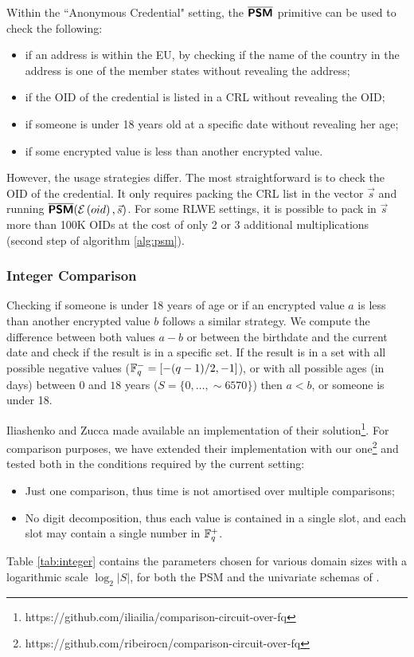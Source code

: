 Within the ``Anonymous Credential" setting, the $\overline{\textsf{\textbf{PSM}}}$ primitive can be used to check the following:
\begin{itemize}
\item if an address is within the EU, by checking if the name of the country in the address is one of the member states without revealing the address;
\item if the OID of the credential is listed in a CRL without revealing the OID;
\item if someone is under 18 years old at a specific date without revealing her age;
\item if some encrypted value is less than another encrypted value.
\end{itemize}
However, the usage strategies differ. The most straightforward is to check the OID of the credential. It only requires packing the CRL list in the vector $\Vec{s}$ and running $\overline{\textsf{\textbf{PSM}}}(\mathcal{E}\left({oid}\right),\Vec{s})$. For some RLWE settings, it is possible to pack in $\Vec{s}$ more than 100K OIDs at the cost of only 2 or 3 additional multiplications (second step of algorithm \ref{alg:psm}).

\subsubsection{Integer Comparison}
Checking if someone is under 18 years of age or if an encrypted value $a$ is less than another encrypted value $b$ follows a similar strategy. We compute the difference between both values $a-b$ or between the birthdate and the current date and check if the result is in a specific set. If the result is in a set with all possible negative values ($\mathbb{F}_q^{-}=[-(q-1)/2,-1]$), or with all possible ages (in days) between $0$ and $18$ years ($S=\{0,\ldots,\sim6570\}$) then $a<b$, or someone is under 18.

Iliashenko and Zucca \cite{iliashenkoFasterHomomorphicComparison2021} made available an implementation of their solution\footnote{https://github.com/iliailia/comparison-circuit-over-fq}. For comparison purposes, we have extended their implementation with our one\footnote{https://github.com/ribeirocn/comparison-circuit-over-fq} and tested both in the conditions required by the current setting:
\begin{itemize}
    \item Just one comparison, thus time is not amortised over multiple comparisons;
    \item No digit decomposition, thus each value is contained in a single slot, and each slot may contain a single number in $\mathbb{F}^{+}_q$.
\end{itemize}
Table \ref{tab:integer} contains the parameters chosen for various domain sizes with a logarithmic scale $\log_2{|S|}$, for both the PSM and the univariate schemas of \cite{iliashenkoFasterHomomorphicComparison2021}. 

